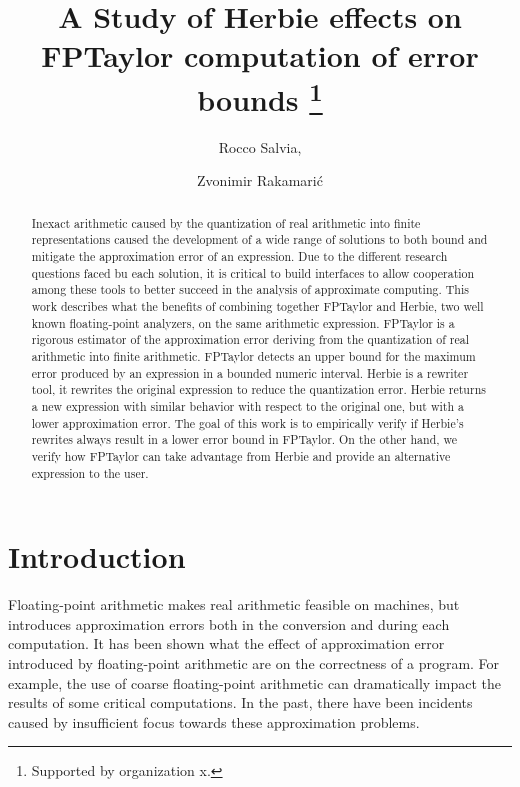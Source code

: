 \documentclass[runningheads]{llncs}
\begin{document}
%
\title{A Study of Herbie effects on FPTaylor computation of error bounds \thanks{Supported by organization x.}}
%
%
\author{Rocco Salvia, \and
Zvonimir Rakamari\'c}
%
%
%
\maketitle              %
%
\begin{abstract}
Inexact arithmetic caused by the quantization of real arithmetic into finite representations caused the development of a wide range of solutions to both bound and mitigate the approximation error of an expression. Due to the different research questions faced bu each solution, it is critical to build interfaces to allow cooperation among these tools to better succeed in the analysis of approximate computing.
This work describes what the benefits of combining together FPTaylor and Herbie, two well known floating-point analyzers, on the same arithmetic expression. 
FPTaylor is a rigorous estimator of the approximation error deriving from the quantization of real arithmetic into finite arithmetic. FPTaylor detects an upper bound for the maximum error produced by an expression in a bounded numeric interval.
Herbie is a rewriter tool, it rewrites the original expression to reduce the quantization error. Herbie returns a new expression with similar behavior with respect to the original one, but with a lower approximation error. The goal of this work is to empirically verify if Herbie's rewrites always result in a lower error bound in FPTaylor. On the other hand, we verify how FPTaylor can take advantage from Herbie and provide an alternative expression to the user.

\end{abstract}

\section{Introduction} Floating-point arithmetic makes real arithmetic feasible on machines, but introduces approximation errors both in the conversion and during each computation. It has been shown what the effect of approximation error introduced by floating-point arithmetic are on the correctness of a program. For example, the use of coarse floating-point arithmetic can dramatically impact the results of some critical computations. In the past, there have been incidents caused by insufficient focus towards these approximation problems.
\end{document}
